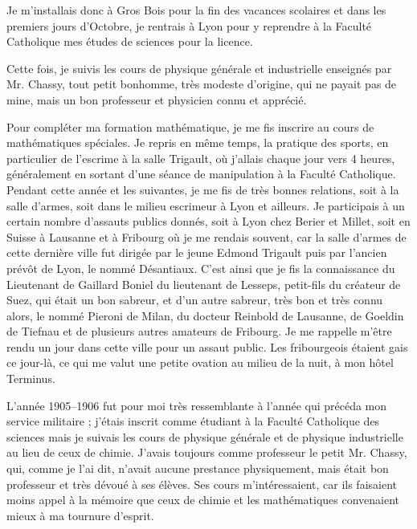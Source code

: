 \documentclass[11pt,a4paper]{report}
\begin{document}
Je m'installais donc à Gros Bois pour la fin des vacances scolaires et dans les premiers jours d'Octobre, je rentrais à Lyon pour y reprendre à la Faculté Catholique mes études de sciences pour la licence.

Cette fois, je suivis les cours de physique générale et industrielle enseignés par Mr. Chassy, tout petit bonhomme, très modeste d'origine, qui ne payait pas de mine, mais un bon professeur et physicien connu et apprécié.

Pour compléter ma formation mathématique, je me fis inscrire au cours de mathématiques spéciales. Je repris en même temps, la pratique des sports, en particulier de l'escrime à la salle Trigault, où j'allais chaque jour vers 4 heures, généralement en sortant d'une séance de manipulation à la Faculté Catholique. Pendant cette année et les suivantes, je me fis de très bonnes relations, soit à la salle d'armes, soit dans le milieu escrimeur à Lyon et ailleurs. Je participais à un certain nombre d'assauts publics donnés, soit à Lyon chez Berier et Millet, soit en Suisse à Lausanne et à Fribourg où je me rendais souvent, car la salle d'armes de cette dernière ville fut dirigée par le jeune Edmond Trigault puis par l'ancien prévôt de Lyon, le nommé Désantiaux. C'est ainsi que je fis la connaissance du Lieutenant de Gaillard Boniel du lieutenant de Lesseps, petit-fils du créateur de Suez, qui était un bon sabreur, et d'un autre sabreur, très bon et très connu alors, le nommé Pieroni de Milan, du docteur Reinbold de Lausanne, de Goeldin de Tiefnau et de plusieurs autres amateurs de Fribourg. Je me rappelle m'être rendu un jour dans cette ville pour un assaut public. Les fribourgeois étaient gais ce jour-là, ce qui me valut une petite ovation au milieu de la nuit, à mon hôtel Terminus.

L'année 1905--1906 fut pour moi très ressemblante à l'année qui précéda mon service militaire ; j'étais inscrit comme étudiant à la Faculté Catholique des sciences mais je suivais les cours de physique générale et de physique industrielle au lieu de ceux de chimie. J'avais toujours comme professeur le petit Mr. Chassy, qui, comme je l'ai dit, n'avait aucune prestance physiquement, mais était bon professeur et très dévoué à ses élèves. Ses cours m'intéressaient, car ils faisaient moins appel à la mémoire que ceux de chimie et les mathématiques convenaient mieux à ma tournure d'esprit.

\end{document}
